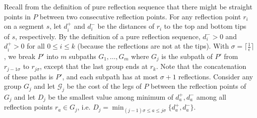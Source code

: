 \documentclass[pdflatex,sn-mathphys-num]{sn-jnl}
\theoremstyle{thmstyleone}
\begin{document}
Recall from the definition of pure reflection sequence that there might be straight points in $P$ between two consecutive reflection points.
For any reflection point $r_i$ on a segment $s$, let $ d_i^+ $ and $ d_i^- $ be the distances of $r_i$ to the top and bottom tips of $s$, respectively. 
By the definition of a pure reflection sequence, $d^-_i > 0 $ and $ d_i^+ > 0 $ for all $0\leq i\leq k $ (because the reflections are not at the tips). 
With  $\sigma=\lceil\frac 1\epsilon\rceil$, we break $P'$ into $m$ subpaths $G_1,\ldots,G_m$ where $G_j$ is the subpath of $P'$ from $r_{{j-1}\sigma}$ to $r_{j\sigma}$,
except that the last group ends at $r_k$. Note that the concatenation of these paths is $P'$, and each subpath has at most $\sigma+1$ reflections.
Consider any group $G_j$ and let $\mathcal G_j$  be the cost of the legs of $P$ between the reflection points of $G_j$ and let $D_j$ be the smallest value among minimum of $d^+_a,d^-_a$ among all reflection points $r_a\in G_j$, i.e. $D_j=\min_{(j-1)\sigma\leq a\leq j\sigma}\{d^+_a,d^-_a\}$.
\end{document}
